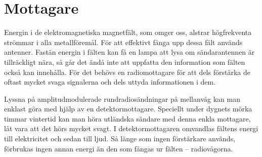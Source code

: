 \chapter{Mottagare}
\label{mottagare}

Energin i de elektromagnetiska magnetfält, som omger oss, alstrar högfrekventa
strömmar i alla metallföremål.
För att effektivt fånga upp dessa fält används antenner.
Fastän energin i fälten kan få en lampa att lysa om sändarantennen är
tillräckligt nära, så går det ändå inte att uppfatta den information som fälten
också kan innehålla.
För det behövs en radiomottagare för att dels förstärka de oftast mycket svaga
signalerna och dels uttyda informationen i dem.

Lyssna på amplitudmodulerade rundradiosändningar på mellanvåg kan man enklast
göra med hjälp av en detektormottagare.
Speciellt under dygnets mörka timmar vintertid kan man höra utländska sändare
med denna enkla mottagare, låt vara att det hörs mycket svagt.
I detektormottagaren omvandlas fältens energi till elektricitet och sedan till
ljud.
Så länge som ingen förstärkare används, förbrukas ingen annan energi än den som
fångas ur fälten -- radiovågorna.
